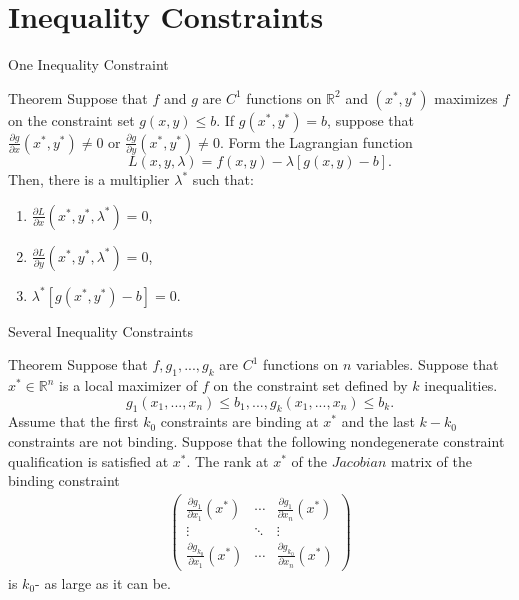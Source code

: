 \documentclass{beamer}
\begin{document}
\section{Inequality Constraints}
\begin{frame}{One Inequality Constraint}
   \begin{block}{Theorem}
    Suppose that $f$ and $g$ are $C^1$ functions on $\mathbb{R}^2$ and $(x^*, y^*)$ maximizes $f$ on the constraint set $g(x,y)\leq b$. If $g(x^*, y^*)=b$, suppose that $\frac{\partial g}{\partial x}(x^*, y^*)\neq 0$ or $\frac{\partial g}{\partial y}(x^*, y^*)\neq 0$. Form the Lagrangian function
    \[L(x,y,\lambda)= f(x,y)-\lambda [g(x,y)-b]. 
    \]
    Then, there is a multiplier $\lambda^*$ such that:
    \begin{enumerate}
        \item $\frac{\partial L}{\partial x}(x^*, y^*, \lambda^*)=0$, 
        \item $\frac{\partial L}{\partial y}(x^*, y^*, \lambda^*)=0$, 
        \item $\lambda^*[g(x^*, y^*)-b]=0$.
    \end{enumerate}
\end{block} 
\end{frame}
\begin{frame}{Several Inequality Constraints}
   \begin{block}{Theorem}
    Suppose that $f, g_1,..., g_k$ are $C^1$ functions on $n$ variables. Suppose that $x^*\in \mathbb{R}^n$ is a local maximizer of $f$ on the constraint set defined by $k$ inequalities. 
    \[g_1(x_1,..., x_n)\leq b_1,..., g_k(x_1,..., x_n)\leq b_k.
    \]
    Assume that the first $k_0$ constraints are binding at $x^*$ and the last $k-k_0$ constraints are not binding. Suppose that the following nondegenerate constraint qualification is satisfied at $x^*$. 
    The rank at $x^*$ of the $Jacobian $ matrix of the binding constraint 
    \begin{align*}
        \begin{pmatrix}
            \frac{\partial g_1}{\partial x_1}(x^*) & \cdots & \frac{\partial g_1}{\partial x_n}(x^*)\\ 
            \vdots & \ddots &\vdots \\
            \frac{\partial g_{k_0}}{\partial x_1}(x^*) & \cdots & \frac{\partial g_{k_0}}{\partial x_n}(x^*)
        \end{pmatrix}
    \end{align*}
    is $k_0$- as large as it can be. 
\end{block} 
\end{frame}
\end{document}
